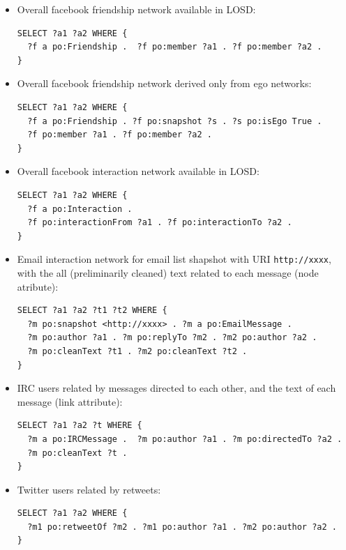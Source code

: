 \documentclass[data,datadescriptor,submit,moreauthors,pdftex]{Definitions/mdpi}
\begin{document}
\begin{itemize}
  \item Overall facebook friendship network available in LOSD:
\begin{lstlisting}[language=spq]
SELECT ?a1 ?a2 WHERE { 
  ?f a po:Friendship .  ?f po:member ?a1 . ?f po:member ?a2 .
}
\end{lstlisting}\vspace{-0.2cm}
  \item Overall facebook friendship network derived only from ego networks:
\begin{lstlisting}[language=spq]
SELECT ?a1 ?a2 WHERE { 
  ?f a po:Friendship . ?f po:snapshot ?s . ?s po:isEgo True .
  ?f po:member ?a1 . ?f po:member ?a2 .
}
\end{lstlisting}\vspace{-0.2cm}
  \item Overall facebook interaction network available in LOSD:
\begin{lstlisting}[language=spq]
SELECT ?a1 ?a2 WHERE { 
  ?f a po:Interaction .
  ?f po:interactionFrom ?a1 . ?f po:interactionTo ?a2 .
}
\end{lstlisting}\vspace{-0.2cm}
  \item Email interaction network for email list shapshot with URI \verb|http://xxxx|, with the all (preliminarily cleaned) text related to each message (node atribute):
\begin{lstlisting}[language=spq]
SELECT ?a1 ?a2 ?t1 ?t2 WHERE { 
  ?m po:snapshot <http://xxxx> . ?m a po:EmailMessage .
  ?m po:author ?a1 . ?m po:replyTo ?m2 . ?m2 po:author ?a2 .
  ?m po:cleanText ?t1 . ?m2 po:cleanText ?t2 .
}
\end{lstlisting}\vspace{-0.2cm}
  \item IRC users related by messages directed to each other, and the text of each message (link attribute):
\begin{lstlisting}[language=spq]
SELECT ?a1 ?a2 ?t WHERE { 
  ?m a po:IRCMessage .  ?m po:author ?a1 . ?m po:directedTo ?a2 .
  ?m po:cleanText ?t .
}
\end{lstlisting}\vspace{-0.2cm}
  \item Twitter users related by retweets:
\begin{lstlisting}[language=spq]
SELECT ?a1 ?a2 WHERE { 
  ?m1 po:retweetOf ?m2 . ?m1 po:author ?a1 . ?m2 po:author ?a2 .
}
\end{lstlisting}\vspace{-0.2cm}

\end{itemize}
\end{document}
